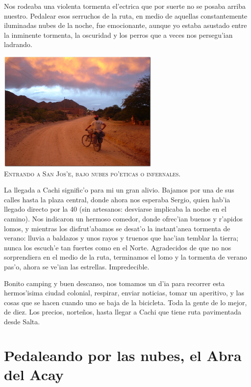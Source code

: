 Nos rodeaba una violenta tormenta el'ectrica que por suerte no se posaba arriba
nuestro. Pedalear esos serruchos de la ruta, en medio de aquellas constantemente
iluminadas nubes de la noche, fue emocionante, aunque yo estaba asustado entre
la inminente tormenta, la oscuridad y los perros que a veces nos persegu'ian
ladrando.

\begin{center} \includegraphics[width=300px]{images/DSC0296.jpg}
\textsc{\\Entrando a San Jos'e, bajo nubes po'eticas o infernales.}
\end{center}

La llegada a Cachi signific'o para mi un gran alivio. Bajamos por una de sus
calles hasta la plaza central, donde ahora nos esperaba Sergio, quien hab'ia
llegado directo por la 40 (sin artesanos: desviarse implicaba la noche en el
camino). Nos indicaron un hermoso comedor, donde ofrec'ian buenos y r'apidos
lomos, y mientras los disfrut'abamos se desat'o la instant'anea tormenta de
verano: lluvia a baldazos y unos rayos y truenos que hac'ian temblar la tierra;
nunca los escuch'e tan fuertes como en el Norte. Agradecidos de que no nos
sorprendiera en el medio de la ruta, terminamos el lomo y la tormenta de verano
pas'o, ahora se ve'ian las estrellas. Impredecible.

Bonito camping y buen descanso, nos tomamos un d'ia para recorrer esta
hermos'isima ciudad colonial, respirar, enviar noticias, tomar un aperitivo, y
las cosas que se hacen cuando uno se baja de la bicicleta. Toda la gente de lo
mejor, de diez. Los precios, norte\~nos, hasta llegar a Cachi que tiene ruta
pavimentada desde Salta.

\section{Pedaleando por las nubes, el Abra del Acay}

